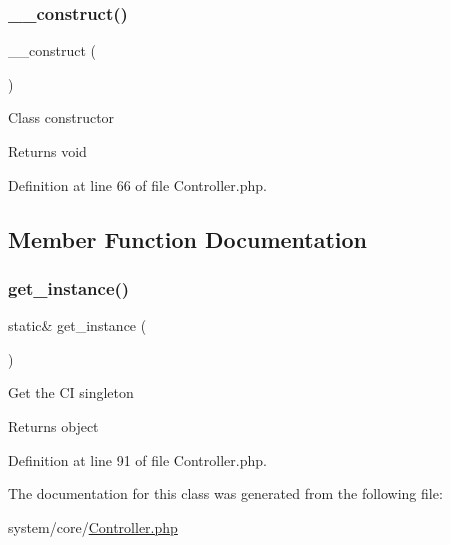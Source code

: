 \subsubsection{\texorpdfstring{\_\_construct()}{\_\_construct()}}
{\footnotesize\ttfamily \+\_\+\+\_\+construct (\begin{DoxyParamCaption}{ }\end{DoxyParamCaption})}

Class constructor

\begin{DoxyReturn}{Returns}
void 
\end{DoxyReturn}


Definition at line 66 of file Controller.\+php.



\subsection{Member Function Documentation}
\mbox{\label{class_c_i___controller_a8d3cc57e7b6ec94e704712b0f277f5bb}} 
\subsubsection{\texorpdfstring{get\_instance()}{get\_instance()}}
{\footnotesize\ttfamily static\& get\+\_\+instance (\begin{DoxyParamCaption}{ }\end{DoxyParamCaption})\hspace{0.3cm}{\ttfamily [static]}}

Get the CI singleton

\begin{DoxyReturn}{Returns}
object 
\end{DoxyReturn}


Definition at line 91 of file Controller.\+php.



The documentation for this class was generated from the following file\+:\begin{DoxyCompactItemize}
\item 
system/core/\mbox{\hyperlink{_controller_8php}{Controller.\+php}}\end{DoxyCompactItemize}

